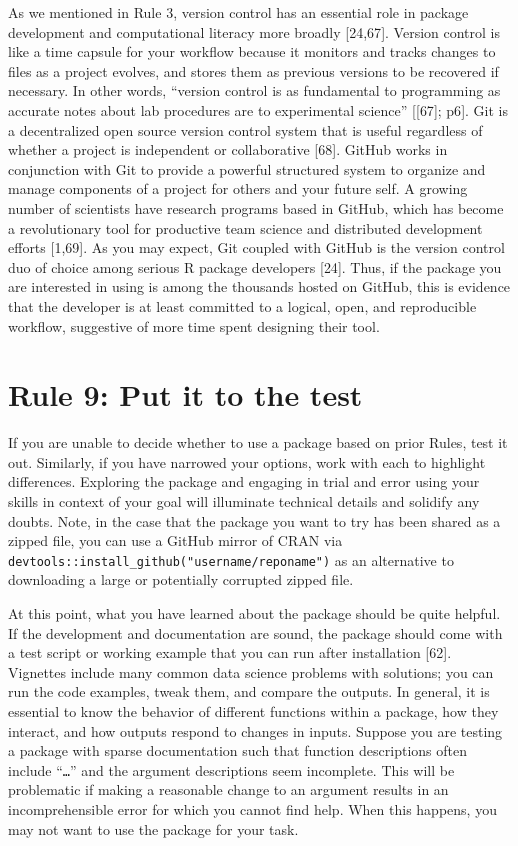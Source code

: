 \documentclass[10pt,letterpaper]{article}
\begin{document}
As we mentioned in Rule 3, version control has an essential role in
package development and computational literacy more broadly {[}24,67{]}.
Version control is like a time capsule for your workflow because it
monitors and tracks changes to files as a project evolves, and stores
them as previous versions to be recovered if necessary. In other words,
``version control is as fundamental to programming as accurate notes
about lab procedures are to experimental science'' {[}{[}67{]}; p6{]}.
Git is a decentralized open source version control system that is useful
regardless of whether a project is independent or collaborative
{[}68{]}. GitHub works in conjunction with Git to provide a powerful
structured system to organize and manage components of a project for
others and your future self. A growing number of scientists have
research programs based in GitHub, which has become a revolutionary tool
for productive team science and distributed development efforts
{[}1,69{]}. As you may expect, Git coupled with GitHub is the version
control duo of choice among serious R package developers {[}24{]}. Thus,
if the package you are interested in using is among the thousands hosted
on GitHub, this is evidence that the developer is at least committed to
a logical, open, and reproducible workflow, suggestive of more time
spent designing their tool.

\hypertarget{rule-9-put-it-to-the-test}{%
\section{Rule 9: Put it to the test}\label{rule-9-put-it-to-the-test}}

If you are unable to decide whether to use a package based on prior
Rules, test it out. Similarly, if you have narrowed your options, work
with each to highlight differences. Exploring the package and engaging
in trial and error using your skills in context of your goal will
illuminate technical details and solidify any doubts. Note, in the case
that the package you want to try has been shared as a zipped file, you
can use a GitHub mirror of CRAN via
\texttt{devtools::install\_github("username/reponame")} as an
alternative to downloading a large or potentially corrupted zipped file.

At this point, what you have learned about the package should be quite
helpful. If the development and documentation are sound, the package
should come with a test script or working example that you can run after
installation {[}62{]}. Vignettes include many common data science
problems with solutions; you can run the code examples, tweak them, and
compare the outputs. In general, it is essential to know the behavior of
different functions within a package, how they interact, and how outputs
respond to changes in inputs. Suppose you are testing a package with
sparse documentation such that function descriptions often include
``\texttt{\ldots{}}'' and the argument descriptions seem incomplete.
This will be problematic if making a reasonable change to an argument
results in an incomprehensible error for which you cannot find help.
When this happens, you may not want to use the package for your task.
\end{document}
